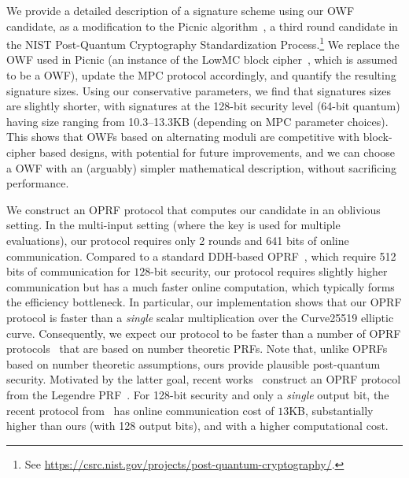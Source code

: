 We provide a detailed description of a signature scheme using our OWF candidate, as a modification to the Picnic algorithm~\cite{chase2017-picnic,CCS:KatKolWan18,kales2020-picnic,picnic-spec}, a third round candidate in the NIST Post-Quantum Cryptography Standardization Process.\footnote{See \url{https://csrc.nist.gov/projects/post-quantum-cryptography/}.} We replace the OWF used in Picnic (an instance of the LowMC block cipher~\cite{albrecht2015-lowmc}, which is assumed to be a OWF), update the MPC protocol accordingly, and quantify the resulting signature sizes.  Using our conservative \ttOWF parameters, we find that signatures sizes are slightly shorter, with signatures at the 128-bit security level (64-bit quantum) having size ranging from 10.3--13.3KB (depending on MPC parameter choices).  This shows that OWFs based on alternating moduli are competitive with block-cipher based designs, with potential for future improvements, and we can choose a OWF with an (arguably) simpler mathematical description, without sacrificing performance.

We construct an OPRF protocol that computes our \ttwPRF candidate in an oblivious setting. In the multi-input setting (where the key is used for multiple evaluations), our protocol requires only 2 rounds and 641 bits of online communication. Compared to a standard DDH-based OPRF~\cite{jarecki2014-ddhoprf,jarecki2016-ddhoprf}, which require 512 bits of communication for $128$-bit security, our protocol requires slightly higher communication but has a much faster online computation, which typically forms the efficiency bottleneck. In particular, our implementation shows that our OPRF protocol is faster than a \textit{single} scalar multiplication over the Curve25519 elliptic curve. Consequently, we expect our protocol to be faster than a number of OPRF protocols~\cite{freedman2005-oprf,jarecki2009-oprf} that are based on number theoretic PRFs. Note that, unlike OPRFs based on number theoretic assumptions, ours provide plausible post-quantum security. Motivated by the latter goal, recent works~\cite{grassi2016-mpcfriendly,seres2021-legendre} construct an OPRF protocol from the Legendre PRF~\cite{damgard1988-legendre}. For 128-bit security and only a {\em single} output bit, the recent protocol from~\cite{seres2021-legendre} has online communication cost of $13$KB, substantially higher than ours (with 128 output bits), and with a higher computational cost. 

